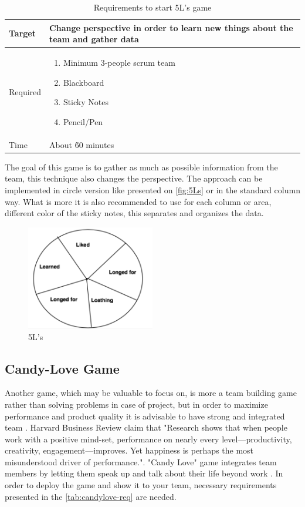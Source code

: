 \begin{table}[h]
	\caption{Requirements to start 5L's game}
	\label{tab:5L-req}
	\begin{tabularx}{\textwidth}{|X|X|}
	\hline
		Target & Change perspective in order to learn new things about the team and gather data  \\ \hline
		Required			& \begin{enumerate}
		    \item Minimum 3-people scrum team
		    \item Blackboard
		    \item Sticky Notes
		    \item Pencil/Pen
		\end{enumerate}	 \\ \hline
		Time & About \~60 minutes\\ \hline
	\end{tabularx}
\end{table}

The goal of this game is to gather as much as possible information from the team, this technique also changes the perspective. The approach can be implemented in circle version like presented on \autoref{fig:5Ls} or in the standard column way. What is more it is also recommended to use for each column or area, different color of the sticky notes, this separates and organizes the data. 

\begin{figure}[h]
\caption{5L's} 
\label{fig:5Ls}
\centering
\includegraphics[width=0.5\textwidth]{img/5L}
\end{figure}

\subsection{Candy-Love Game}
Another game, which may be valuable to focus on, is more a team building game rather than solving problems in case of project, but in order to maximize performance and product quality it is advisable to have strong and integrated team \cite{ForbesArticle}. Harvard Business Review claim that "Research shows that when people work with a positive mind-set, performance on nearly every level—productivity, creativity, engagement—improves. Yet happiness is perhaps the most misunderstood driver of performance.". \cite{HarvardArticle} "Candy Love" game integrates team members by letting them speak up and talk about their life beyond work \cite{CandyLoveBibliography}. In order to deploy the game and show it to your team, necessary requirements presented in the \autoref{tab:candylove-req} are needed.


